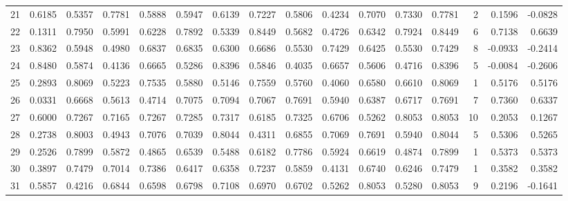 \begin{tabular}{lrrrrrrrrrrrrrrr}
21  &      0.6185 &  0.5357 &  0.7781 &  0.5888 &  0.5947 &  0.6139 &  0.7227 &  0.5806 &  0.4234 &  0.7070 &   0.7330 &     0.7781 &      2 &                    0.1596 &                    -0.0828 \\
22  &      0.1311 &  0.7950 &  0.5991 &  0.6228 &  0.7892 &  0.5339 &  0.8449 &  0.5682 &  0.4726 &  0.6342 &   0.7924 &     0.8449 &      6 &                    0.7138 &                     0.6639 \\
23  &      0.8362 &  0.5948 &  0.4980 &  0.6837 &  0.6835 &  0.6300 &  0.6686 &  0.5530 &  0.7429 &  0.6425 &   0.5530 &     0.7429 &      8 &                   -0.0933 &                    -0.2414 \\
24  &      0.8480 &  0.5874 &  0.4136 &  0.6665 &  0.5286 &  0.8396 &  0.5846 &  0.4035 &  0.6657 &  0.5606 &   0.4716 &     0.8396 &      5 &                   -0.0084 &                    -0.2606 \\
25  &      0.2893 &  0.8069 &  0.5223 &  0.7535 &  0.5880 &  0.5146 &  0.7559 &  0.5760 &  0.4060 &  0.6580 &   0.6610 &     0.8069 &      1 &                    0.5176 &                     0.5176 \\
26  &      0.0331 &  0.6668 &  0.5613 &  0.4714 &  0.7075 &  0.7094 &  0.7067 &  0.7691 &  0.5940 &  0.6387 &   0.6717 &     0.7691 &      7 &                    0.7360 &                     0.6337 \\
27  &      0.6000 &  0.7267 &  0.7165 &  0.7267 &  0.7285 &  0.7317 &  0.6185 &  0.7325 &  0.6706 &  0.5262 &   0.8053 &     0.8053 &     10 &                    0.2053 &                     0.1267 \\
28  &      0.2738 &  0.8003 &  0.4943 &  0.7076 &  0.7039 &  0.8044 &  0.4311 &  0.6855 &  0.7069 &  0.7691 &   0.5940 &     0.8044 &      5 &                    0.5306 &                     0.5265 \\
29  &      0.2526 &  0.7899 &  0.5872 &  0.4865 &  0.6539 &  0.5488 &  0.6182 &  0.7786 &  0.5924 &  0.6619 &   0.4874 &     0.7899 &      1 &                    0.5373 &                     0.5373 \\
30  &      0.3897 &  0.7479 &  0.7014 &  0.7386 &  0.6417 &  0.6358 &  0.7237 &  0.5859 &  0.4131 &  0.6740 &   0.6246 &     0.7479 &      1 &                    0.3582 &                     0.3582 \\
31  &      0.5857 &  0.4216 &  0.6844 &  0.6598 &  0.6798 &  0.7108 &  0.6970 &  0.6702 &  0.5262 &  0.8053 &   0.5280 &     0.8053 &      9 &                    0.2196 &                    -0.1641 \\

\end{tabular}

